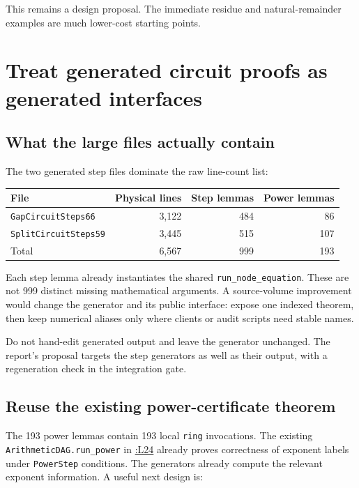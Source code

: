 \documentclass[11pt,letterpaper]{article}
\newcommand{\src}[2]{\href{https://github.com/VladimirReshetnikov/ProveIt/blob/60e9c5d620c6c387d932876cfa2d9376f64ea56c/Computability/DiophantineConsistency/Lean/DiophantineConsistency/#1.lean\#L#2}{\texttt{\detokenize{#1}}:L#2}}
\begin{document}
This remains a design proposal. The immediate residue and natural-remainder
examples are much lower-cost starting points.

\section{Treat generated circuit proofs as generated interfaces}

\subsection{What the large files actually contain}

The two generated step files dominate the raw line-count list:

\begin{center}
\begin{tabular}{@{}lrrr@{}}
\toprule
File & Physical lines & Step lemmas & Power lemmas\\
\midrule
\texttt{GapCircuitSteps66} & 3,122 & 484 & 86\\
\texttt{SplitCircuitSteps59} & 3,445 & 515 & 107\\
\midrule
Total & 6,567 & 999 & 193\\
\bottomrule
\end{tabular}
\end{center}

Each step lemma already instantiates the shared
\texttt{run\_node\_equation}. These are not 999 distinct missing mathematical
arguments. A source-volume improvement would change the generator and its
public interface: expose one indexed theorem, then keep numerical aliases
only where clients or audit scripts need stable names.

Do not hand-edit generated output and leave the generator unchanged. The
report's proposal targets the step generators as well as their output,
with a regeneration check in the integration gate.

\subsection{Reuse the existing power-certificate theorem}

The 193 power lemmas contain 193 local \texttt{ring} invocations. The
existing \texttt{ArithmeticDAG.run\_power} in \src{ArithmeticDAGPowers}{24} already proves correctness
of exponent labels under \texttt{PowerStep} conditions. The generators
already compute the relevant exponent information. A useful next design is:
\end{document}
